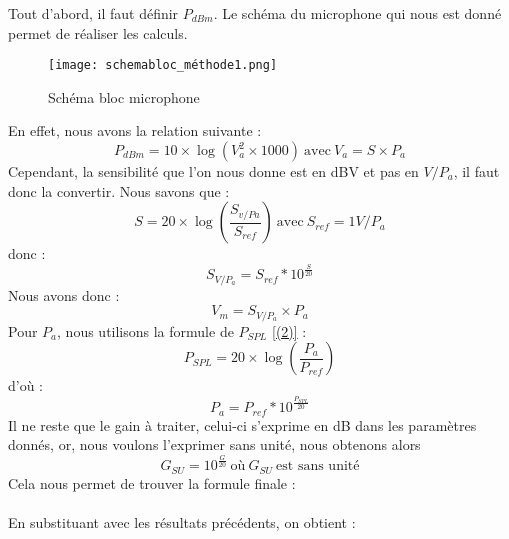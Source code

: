 Tout d'abord, il faut définir $P_{dBm}$. Le schéma du microphone qui nous est donné permet de réaliser les calculs.

\begin{figure}[htb]
    \centering
    \texttt{[image: schemabloc\_méthode1.png]}
    \caption{Schéma bloc microphone}
    \label{fig:Schéma_Fonctionnel_1}
\end{figure}

En effet, nous avons la relation suivante :
\begin{equation}
P_{dBm} = 10 \times \log(V_a^2 \times 1000) \ \text{avec}\ V_a = S \times P_a
\end{equation}
Cependant, la sensibilité que l'on nous donne est en dBV et pas en $V/P_a$, il faut donc la convertir. Nous savons que :\begin{equation}
    S = 20\times \log(\frac{S_{v/Pa}}{S_{ref}}) \ \text{avec}\  S_{ref} = 1 V/P_a
\end{equation} donc :
\begin{equation}
   S_{V/P_a} = S_{ref}*10^\frac{S}{20} 
\end{equation}
Nous avons donc :
\begin{equation}
V_m = S_{V/P_a} \times P_a
\end{equation} 
Pour $P_a$, nous utilisons la formule de $P_{SPL}$ \ref{(2)} : 
\begin{equation}
    P_{SPL} = 20\times \log(\frac{P_a}{P_{ref}}) 
\end{equation}
d'où :
\begin{equation}
P_a = P_{ref} * 10^{\frac{P_{SPL}}{20}}
\end{equation}
Il ne reste que le gain à traiter, celui-ci s'exprime en dB dans les paramètres donnés, or, nous voulons l'exprimer sans unité, nous obtenons alors 
\begin{equation}
    G_{SU} = 10^\frac{G}{20} \ \text{où} \ G_{SU} \ \text{est sans unité}
\end{equation}
Cela nous permet de trouver la formule finale : 
\\
\\
En substituant avec les résultats précédents, on obtient :
\\
